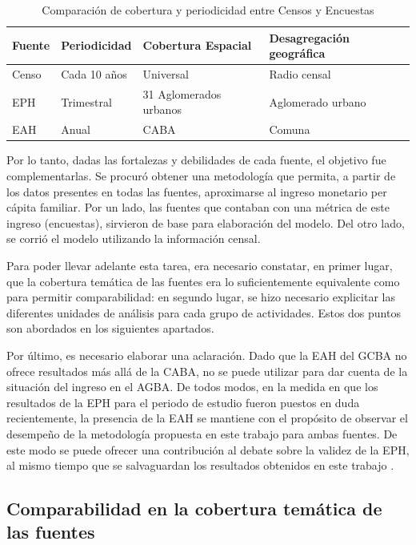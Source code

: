 \begin{table}[h!]
	\centering
	\caption{Comparación de cobertura y periodicidad entre Censos y Encuestas }
	\label{tab:table1}
	\begin{tabular}{l|l|l|l}
		Fuente & Periodicidad & Cobertura Espacial & Desagregación geográfica\\
		\hline
		Censo & Cada 10 años & Universal & Radio censal\\
		\hline
		EPH & Trimestral & 31 Aglomerados urbanos & Aglomerado urbano\\
		\hline
		EAH & Anual & CABA & Comuna\\
	\end{tabular}
\end{table}

Por lo tanto, dadas las fortalezas y debilidades de cada fuente, el objetivo fue complementarlas. Se procuró obtener una metodología que permita, a partir de los datos presentes en todas las fuentes, aproximarse al ingreso monetario per cápita familiar. Por un lado, las fuentes que contaban con una métrica de este ingreso (encuestas), sirvieron de base para elaboración del modelo. Del otro lado, se corrió el modelo utilizando la información censal.

Para poder llevar adelante esta tarea, era necesario constatar, en primer lugar, que la cobertura temática de las fuentes era lo suficientemente equivalente como para permitir comparabilidad: en segundo lugar, se hizo necesario explicitar las diferentes unidades de análisis para cada grupo de actividades. Estos dos puntos son abordados en los siguientes apartados. 

Por último, es necesario elaborar una aclaración. Dado que la EAH del GCBA no ofrece resultados más allá de la CABA, no se puede utilizar para dar cuenta de la situación del ingreso en el AGBA. De todos modos, en la medida en que los resultados de la EPH para el periodo de estudio fueron puestos en duda recientemente, la presencia de la EAH se mantiene con el propósito de observar el desempeño de la metodología propuesta en este trabajo para ambas fuentes. De este modo se puede ofrecer una contribución al debate sobre la validez de la EPH, al mismo tiempo que se salvaguardan los resultados obtenidos en este trabajo \cite{indec2016}.


	\subsection{Comparabilidad en la cobertura temática de las fuentes}
	
